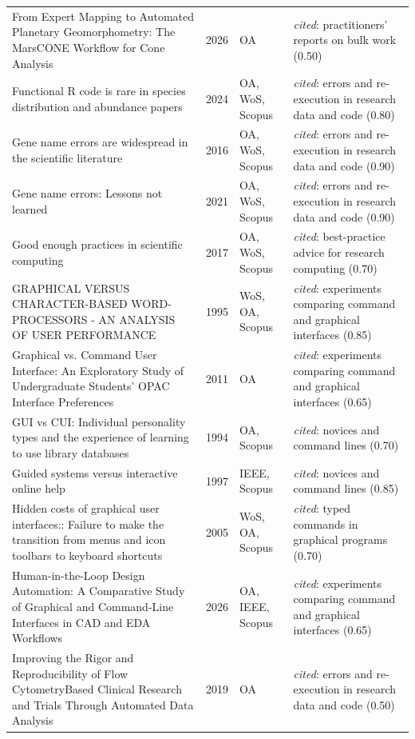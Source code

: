 \begin{longtable}{@{}%
  >{\raggedright\arraybackslash}p{}c%
  >{\raggedright\arraybackslash}p{}%
  >{\raggedright\arraybackslash}p{}@{}}
From Expert Mapping to Automated Planetary Geomorphometry: The MarsCONE Workflow for Cone Analysis & 2026 & OA & \emph{cited}: practitioners' reports on bulk work (0.50) \\
Functional R code is rare in species distribution and abundance papers & 2024 & OA, WoS, Scopus & \emph{cited}: errors and re-execution in research data and code (0.80) \\
Gene name errors are widespread in the scientific literature & 2016 & OA, WoS, Scopus & \emph{cited}: errors and re-execution in research data and code (0.90) \\
Gene name errors: Lessons not learned & 2021 & OA, WoS, Scopus & \emph{cited}: errors and re-execution in research data and code (0.90) \\
Good enough practices in scientific computing & 2017 & OA, WoS, Scopus & \emph{cited}: best-practice advice for research computing (0.70) \\
GRAPHICAL VERSUS CHARACTER-BASED WORD-PROCESSORS - AN ANALYSIS OF USER PERFORMANCE & 1995 & WoS, OA, Scopus & \emph{cited}: experiments comparing command and graphical interfaces (0.85) \\
Graphical vs. Command User Interface: An Exploratory Study of Undergraduate Students' OPAC Interface Preferences & 2011 & OA & \emph{cited}: experiments comparing command and graphical interfaces (0.65) \\
GUI vs CUI: Individual personality types and the experience of learning to use library databases & 1994 & OA, Scopus & \emph{cited}: novices and command lines (0.70) \\
Guided systems versus interactive online help & 1997 & IEEE, Scopus & \emph{cited}: novices and command lines (0.85) \\
Hidden costs of graphical user interfaces:: Failure to make the transition from menus and icon toolbars to keyboard shortcuts & 2005 & WoS, OA, Scopus & \emph{cited}: typed commands in graphical programs (0.70) \\
Human-in-the-Loop Design Automation: A Comparative Study of Graphical and Command-Line Interfaces in CAD and EDA Workflows & 2026 & OA, IEEE, Scopus & \emph{cited}: experiments comparing command and graphical interfaces (0.65) \\
Improving the Rigor and Reproducibility of Flow CytometryBased Clinical Research and Trials Through Automated Data Analysis & 2019 & OA & \emph{cited}: errors and re-execution in research data and code (0.50) \\

\end{longtable}
